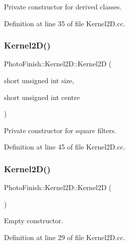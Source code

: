 Private constructor for derived classes. 



Definition at line 35 of file Kernel2\+D.\+cc.

\mbox{\label{class_photo_finish_1_1_kernel2_d_abaf8fb7dc013f446340bd920f18a9a0d}} 
\subsubsection{\texorpdfstring{Kernel2\+D()}{Kernel2D()}\hspace{0.1cm}{\footnotesize\ttfamily [2/3]}}
{\footnotesize\ttfamily Photo\+Finish\+::\+Kernel2\+D\+::\+Kernel2D (\begin{DoxyParamCaption}\item[{short unsigned int}]{size,  }\item[{short unsigned int}]{centre }\end{DoxyParamCaption})\hspace{0.3cm}{\ttfamily [protected]}}



Private constructor for square filters. 



Definition at line 45 of file Kernel2\+D.\+cc.

\mbox{\label{class_photo_finish_1_1_kernel2_d_a41562fb9c80ee1aed47879347df24b4f}} 
\subsubsection{\texorpdfstring{Kernel2\+D()}{Kernel2D()}\hspace{0.1cm}{\footnotesize\ttfamily [3/3]}}
{\footnotesize\ttfamily Photo\+Finish\+::\+Kernel2\+D\+::\+Kernel2D (\begin{DoxyParamCaption}{ }\end{DoxyParamCaption})}



Empty constructor. 



Definition at line 29 of file Kernel2\+D.\+cc.

